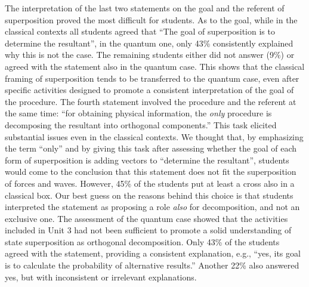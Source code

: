 \documentclass[twocolumn,secnumarabic,amssymb, nobibnotes, aps, prd, nofootinbib]{revtex4-2}
\begin{document}
The interpretation of the last two statements on the goal and the referent of superposition proved the most difficult for students. As to the goal, while in the classical contexts all students agreed that ``The goal of superposition is to determine the resultant'', in the quantum one, only 43\% consistently explained why this is not the case. The remaining students either did not answer (9\%) or agreed with the statement also in the quantum case. This shows that the classical framing of superposition tends to be transferred to the quantum case, even after specific activities designed to promote a consistent interpretation of the goal of the procedure.
The fourth statement involved the procedure and the referent at the same time: ``for obtaining physical information, the \emph{only} procedure  is decomposing the resultant into orthogonal components.'' This task elicited substantial issues even in the classical contexts. We thought that, by emphasizing the term ``only'' and by giving this task after assessing whether the goal of each form of superposition is adding vectors to ``determine the resultant'', students would come to the conclusion that this statement does not fit the superposition of forces and waves. However, 45\% of the students put at least a cross also in a classical box. Our best guess on the reasons behind this choice is that students interpreted the statement as proposing a role \emph{also} for decomposition, and not an exclusive one.
The assessment of the quantum case showed that the activities included in Unit 3 had not been sufficient to promote a solid understanding of state superposition as orthogonal decomposition. Only 43\% of the students agreed with the statement, providing a consistent explanation, e.g., ``yes, its goal is to calculate the probability of alternative results.'' Another 22\% also answered yes, but with inconsistent or irrelevant explanations.
\end{document}
